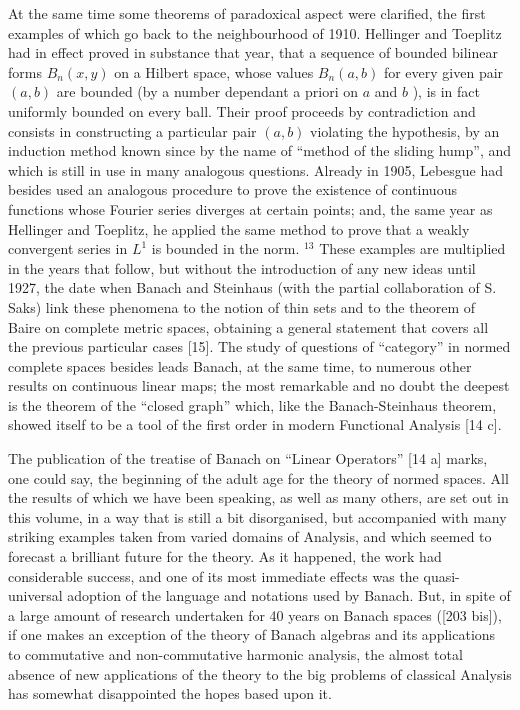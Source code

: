 At the same time some theorems of paradoxical aspect were clarified, the first examples of which go back to the neighbourhood of 1910. Hellinger and Toeplitz had in effect proved in substance that year, that a sequence of bounded bilinear forms \(B_n(x,y)\) on a Hilbert space, whose values \(B_n(a,b)\) for every given pair \((a,b)\) are bounded (by a number dependant a priori on \(a\) and \(b\) ), is in fact uniformly bounded on every ball. Their proof proceeds by contradiction and consists in constructing a particular pair \((a,b)\) violating the hypothesis, by an induction method known since by the name of ``method of the sliding hump'', and which is still in use in many analogous questions. Already in 1905, Lebesgue had besides used an analogous procedure to prove the existence of continuous functions whose Fourier series diverges at certain points; and, the same year as Hellinger and Toeplitz, he applied the same method to prove that a weakly convergent series in \(L^1\) is bounded in the norm. \(^{13}\) These examples are multiplied in the years that follow, but without the introduction of any new ideas until 1927, the date when Banach and Steinhaus (with the partial collaboration of S. Saks) link these phenomena to the notion of thin sets and to the theorem of Baire on complete metric spaces, obtaining a general statement that covers all the previous particular cases {[}15{]}. The study of questions of ``category'' in normed complete spaces besides leads Banach, at the same time, to numerous other results on continuous linear maps; the most remarkable and no doubt the deepest is the theorem of the ``closed graph'' which, like the Banach-Steinhaus theorem, showed itself to be a tool of the first order in modern Functional Analysis {[}14 c{]}.

The publication of the treatise of Banach on ``Linear Operators'' {[}14 a{]} marks, one could say, the beginning of the adult age for the theory of normed spaces. All the results of which we have been speaking, as well as many others, are set out in this volume, in a way that is still a bit disorganised, but accompanied with many striking examples taken from varied domains of Analysis, and which seemed to forecast a brilliant future for the theory. As it happened, the work had considerable success, and one of its most immediate effects was the quasi-universal adoption of the language and notations used by Banach. But, in spite of a large amount of research undertaken for 40 years on Banach spaces ({[}203 bis{]}), if one makes an exception of the theory of Banach algebras and its applications to commutative and non-commutative harmonic analysis, the almost total absence of new applications of the theory to the big problems of classical Analysis has somewhat disappointed the hopes based upon it.

